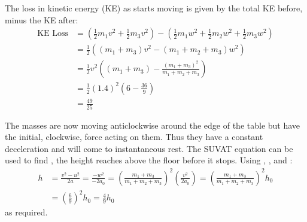 \begin{problem}[A1969AMIIQ2a]
{\begin{enumerate}
		The loss in kinetic energy (KE) as  starts moving is given by the total KE before, minus the KE after:
		\begin{eqnarray*} 
			\text{KE Loss} &= \left( \frac{1}{2}m_{1}v^{2} + \frac{1}{2}m_{3}v^{2} \right) - \left( \frac{1}{2}m_{1}w^{2} + \frac{1}{2}m_{2}w^{2} + \frac{1}{2}m_{3}w^{2} \right) \\ 
			&= \frac{1}{2} \left( (m_{1} + m_{3})v^{2} - (m_{1} + m_{2} + m_{3})w^{2} \right) \\ 
			&= \frac{1}{2}v^{2} \left( (m_{1} + m_{3}) - \frac{(m_{1} + m_{3})^{2}}{m_{1} + m_{2} + m_{3}} \right) \\ 
			&= \frac{1}{2}(1.4)^{2} \left( 6 - \frac{36}{9} \right) \\ 
			&= \frac{49}{25}
		\end{eqnarray*}
		\end{enumerate}
	
The masses are now moving anticlockwise around the edge of the table but have the initial, clockwise, force acting on them. Thus they have a constant deceleration and will come to instantaneous rest. The SUVAT equation  can be used to find , the height  reaches above the floor before it stops. Using , ,  and :
		\begin{eqnarray*}
 			h &= \frac{v^{2} - u^{2}}{2a} = \frac{-w^{2}}{-2a_{0}} = \left( \frac{m_{1} + m_{3}}{m_{1} + m_{2} + m_{3}} \right)^{2} \left( \frac{v^{2}}{2a_{0}} \right) =  \left( \frac{m_{1} + m_{3}}{m_{1} + m_{2} + m_{3}} \right)^{2} h_{0} \\ 
 			&= \left( \frac{6}{9} \right)^{2} h_{0} = \frac{4}{9} h_{0}
 		\end{eqnarray*} 
 		as required.
}
\end{problem}